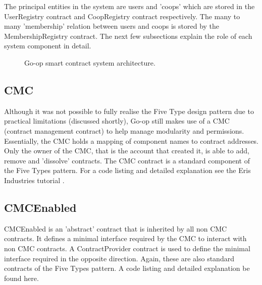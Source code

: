 The principal entities in the system are users and 'coops' which are stored in the UserRegistry contract and CoopRegistry contract respectively. The many to many 'membership' relation between users and coops is stored by the MembershipRegistry contract. The next few subsections explain the role of each system component in detail.\\

\begin{figure}
\centering
{}
\decoRule
\caption[Go-op Smart Contract System Architecture]{Go-op smart contract system architecture.}
\label{fig:SCArch}
\end{figure}

\subsection{CMC}
Although it was not possible to fully realise the Five Type design pattern due to practical limitations (discussed shortly), Go-op still makes use of a CMC (contract management contract) to help manage modularity and permissions. Essentially, the CMC holds a mapping of component names to contract addresses. Only the owner of the CMC, that is the account that created it, is able to add, remove and 'dissolve' contracts. The CMC contract is a standard component of the Five Types pattern. For a code listing and detailed explanation see the Eris Industries tutorial \cite{FiveTypes}.

\subsection{CMCEnabled}
CMCEnabled is an 'abstract' contract that is inherited by all non CMC contracts. It defines a minimal interface required by the CMC to interact with non CMC contracts. A ContractProvider contract is used to define the minimal interface required in the opposite direction. Again, these are also standard contracts of the Five Types pattern. A code listing and detailed explanation be found here\cite{FiveTypes}.\\

